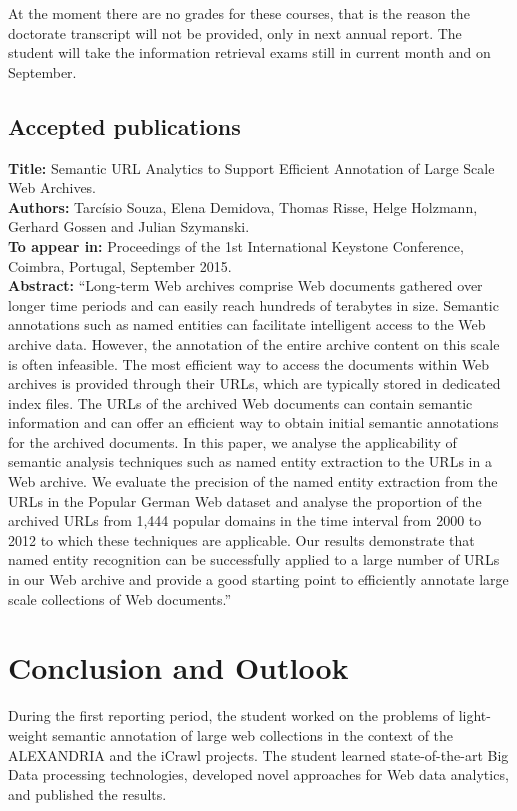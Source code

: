 \documentclass[a4paper,11pt]{report}
\begin{document}
At the moment there are no grades for these courses, that is the reason the
doctorate transcript will not be provided, only in next annual report. The
student will take the information retrieval exams still in current month and
on September.
\section{Accepted publications}

\textbf{Title:} Semantic URL Analytics to Support Efficient Annotation of Large Scale Web Archives. \\
\textbf{Authors:} Tarcísio Souza, Elena Demidova, Thomas Risse, Helge Holzmann, Gerhard Gossen and Julian Szymanski. \\
\textbf{To appear in:} Proceedings of the 1st International Keystone Conference, Coimbra, Portugal, September 2015.\\
\textbf{Abstract:}
``Long-term Web archives comprise Web documents gathered over longer time periods and can easily reach hundreds of terabytes in size.
Semantic annotations such as named entities can facilitate intelligent access to the Web archive data. 
However, the annotation of the entire archive content on this scale is often infeasible. The most efficient way to access the documents within Web archives is provided through their URLs, which are typically stored in 
dedicated index files. The URLs of the archived Web documents can contain
semantic information and can offer an efficient way to obtain initial semantic annotations for the archived documents. 
In this paper, we analyse the applicability of semantic analysis techniques such as named entity extraction
to the URLs in a Web archive. We evaluate the precision of the named entity
extraction from the URLs in the Popular German Web dataset and analyse the
proportion of the archived URLs from 1,444 popular domains in the time interval from 2000 to 2012 to which these techniques are applicable.
Our results demonstrate that named entity recognition can be successfully applied to a large number of URLs in 
our Web archive and provide a good starting point to efficiently annotate large scale collections of Web documents.''



\chapter {Conclusion and Outlook}

During the first reporting period, the student worked on the problems 
of light-weight semantic annotation of large web collections in the 
context of the ALEXANDRIA and the iCrawl projects. The student learned 
state-of-the-art Big Data processing technologies,
developed novel approaches for Web data analytics, and published the results.
\end{document}

